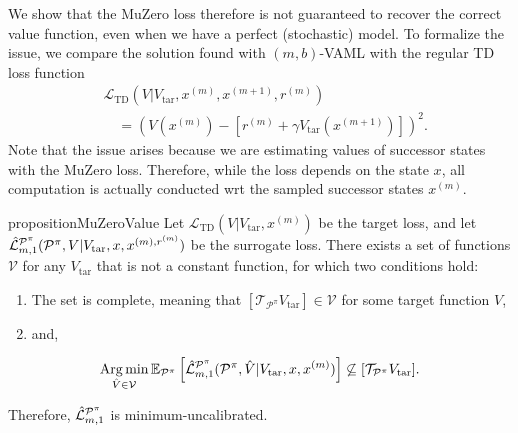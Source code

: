 We show that the MuZero loss therefore is not guaranteed to recover the correct value function, even when we have a perfect (stochastic) model.
To formalize the issue, we compare the solution found with $(m,b)$-VAML with the regular TD loss function
\begin{align}
    &\mathcal{L}_\mathrm{TD}(V|V_\mathrm{tar}, x^{(m)},x^{(m+1)},r^{(m)}) \nonumber\\
    &\quad=\left(V(x^{(m)}) - \left[r^{(m)} + \gamma V_\mathrm{tar}(x^{(m+1)})\right]\right)^2.
\end{align}
Note that the issue arises because we are estimating values of successor states with the MuZero loss.
Therefore, while the loss depends on the state $x$, all computation is actually conducted wrt the sampled successor states $x^{(m)}$.

\begin{restatable}{proposition}{MuZeroValue}\label{prop:cvaml:2_3}
    Let $\mathcal{L}_\mathrm{TD}(V|V_\mathrm{tar}, x^{(m)})$ be the target loss, and let $\hat{\mathcal{L}}^{\P^\pi}_{m,1}(\P^\pi,V|\allowbreak V_\mathrm{tar},x, x^{(m), r^{(m)}})$ be the surrogate loss. 
    There exists a set of functions $\mathcal{V}$ for any $V_\mathrm{tar}$ that is not a constant function, for which two conditions hold:
    \begin{enumerate}
        \item The set is complete, meaning that $[\mathcal{T}_{\mathcal{P}^\pi}V_\mathrm{tar}] \in \mathcal{V}$ for some target function $V$,
        \item and,
    \end{enumerate}
     $$ \Argmin_{\hat{V} \in \mathcal{V}} \mathbb{E}_{\P^\pi}\squareb{\hat{\mathcal{L}}^{\P^\pi}_{m,1}(\P^\pi, \hat{V}| V_\mathrm{tar}, x, x^{(m)})} \not \subseteq [\mathcal{T}_{\P^\pi} V_\mathrm{tar}].$$

    Therefore, $\hat{\mathcal{L}}^{\P^\pi}_{m,1}$ is minimum-uncalibrated.
\end{restatable}
